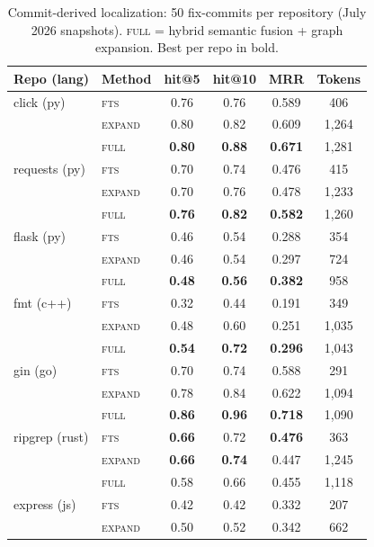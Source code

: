 \documentclass[11pt]{article}
\begin{document}
\begin{table}[t]
\centering
\caption{Commit-derived localization: 50 fix-commits per repository
(July 2026 snapshots). \textsc{full} = hybrid semantic fusion + graph
expansion. Best per repo in bold.}
\small
\begin{tabular}{llcccc}
\toprule
Repo (lang) & Method & hit@5 & hit@10 & MRR & Tokens \\
\midrule
click (py)    & \textsc{fts} & 0.76 & 0.76 & 0.589 & 406 \\
              & \textsc{expand} & 0.80 & 0.82 & 0.609 & 1{,}264 \\
              & \textsc{full} & \textbf{0.80} & \textbf{0.88} & \textbf{0.671} & 1{,}281 \\
requests (py) & \textsc{fts} & 0.70 & 0.74 & 0.476 & 415 \\
              & \textsc{expand} & 0.70 & 0.76 & 0.478 & 1{,}233 \\
              & \textsc{full} & \textbf{0.76} & \textbf{0.82} & \textbf{0.582} & 1{,}260 \\
flask (py)    & \textsc{fts} & 0.46 & 0.54 & 0.288 & 354 \\
              & \textsc{expand} & 0.46 & 0.54 & 0.297 & 724 \\
              & \textsc{full} & \textbf{0.48} & \textbf{0.56} & \textbf{0.382} & 958 \\
fmt (c++)     & \textsc{fts} & 0.32 & 0.44 & 0.191 & 349 \\
              & \textsc{expand} & 0.48 & 0.60 & 0.251 & 1{,}035 \\
              & \textsc{full} & \textbf{0.54} & \textbf{0.72} & \textbf{0.296} & 1{,}043 \\
gin (go)      & \textsc{fts} & 0.70 & 0.74 & 0.588 & 291 \\
              & \textsc{expand} & 0.78 & 0.84 & 0.622 & 1{,}094 \\
              & \textsc{full} & \textbf{0.86} & \textbf{0.96} & \textbf{0.718} & 1{,}090 \\
ripgrep (rust)& \textsc{fts} & \textbf{0.66} & 0.72 & \textbf{0.476} & 363 \\
              & \textsc{expand} & \textbf{0.66} & \textbf{0.74} & 0.447 & 1{,}245 \\
              & \textsc{full} & 0.58 & 0.66 & 0.455 & 1{,}118 \\
express (js)  & \textsc{fts} & 0.42 & 0.42 & 0.332 & 207 \\
              & \textsc{expand} & 0.50 & 0.52 & 0.342 & 662 \\

\end{tabular}
\end{table}
\end{document}
